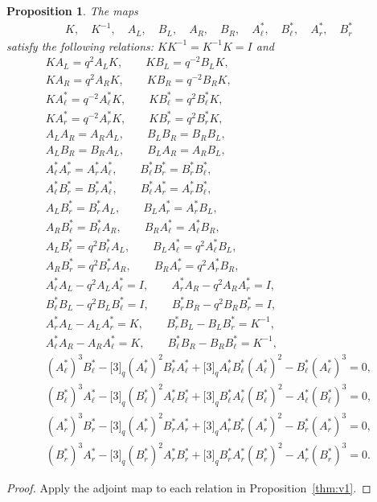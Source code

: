 \documentclass[pdftex]{sigma}
\numberwithin{equation}{section}
\newtheorem{Proposition}[Theorem]{Proposition}
 { \theoremstyle{definition}
\newtheorem{Definition}[Theorem]{Definition}
\newtheorem{Example}[Theorem]{Example}
\newtheorem{Note}[Theorem]{Note}
}
\begin{document}
\begin{Proposition}\label{thm:v2}The maps
\begin{gather}\label{eq:maplist2}
K, \quad K^{-1},
\quad
A_L,
\quad
B_L,
\quad
A_R,
\quad
B_R,
\quad
A^*_\ell,
\quad
B^*_\ell,
\quad
A^*_r,
\quad
B^*_r
\end{gather}
satisfy the following relations: $K K^{-1} = K^{-1}K = I$ and
\begin{gather*}
K A_L = q^{2} A_L K,\qquad K B_L = q^{-2} B_L K,\\
K A_R = q^{2} A_R K,\qquad K B_R = q^{-2} B_R K,\\
K A^*_\ell = q^{-2} A^*_\ell K,\qquad K B^*_\ell = q^{2} B^*_\ell K,\\
K A^*_r = q^{-2} A^*_r K,\qquad K B^*_r = q^{2} B^*_r K,\\
A_L A_R = A_R A_L, \qquad B_L B_R = B_R B_L,\\
A_L B_R = B_R A_L, \qquad B_L A_R = A_R B_L,\\
A^*_\ell A^*_r = A^*_r A^*_\ell, \qquad B^*_\ell B^*_r = B^*_r B^*_\ell,\\
A^*_\ell B^*_r = B^*_r A^*_\ell, \qquad B^*_\ell A^*_r = A^*_r B^*_\ell,\\
A_L B^*_r = B^*_r A_L, \qquad B_L A^*_r = A^*_r B_L,\\
 A_R B^*_\ell = B^*_\ell A_R, \qquad B_R A^*_\ell = A^*_\ell B_R,\\
A_L B^*_\ell = q^{2} B^*_\ell A_L, \qquad B_L A^*_\ell = q^{2} A^*_\ell B_L,\\
A_R B^*_r = q^{2} B^*_r A_R, \qquad B_R A^*_r = q^{2} A^*_r B_R,\\
 A^*_\ell A_L - q^{2} A_L A^*_\ell = I,\qquad A^*_r A_R - q^2 A_R A^*_r = I,\\
 B^*_\ell B_L - q^2 B_L B^*_\ell = I,\qquad B^*_r B_R - q^2 B_R B^*_r = I,\\
A^*_r A_L - A_L A^*_r = K,\qquad B^*_r B_L - B_L B^*_r = K^{-1},\\
A^*_\ell A_R - A_R A^*_\ell = K,\qquad B^*_\ell B_R - B_R B^*_\ell = K^{-1},\\
(A^*_\ell)^3 B^*_\ell-\lbrack 3 \rbrack_q (A^*_\ell)^2 B^*_\ell A^*_\ell+
\lbrack 3 \rbrack_q A^*_\ell B^*_\ell (A^*_\ell)^2-B^*_\ell (A^*_\ell)^3 = 0,\\
(B^*_\ell)^3 A^*_\ell-\lbrack 3 \rbrack_q (B^*_\ell)^2 A^*_\ell B^*_\ell+
\lbrack 3 \rbrack_q B^*_\ell A^*_\ell (B^*_\ell)^2-A^*_\ell (B^*_\ell)^3 = 0,\\
(A^*_r)^3 B^*_r-\lbrack 3 \rbrack_q (A^*_r)^2 B^*_r A^*_r+\lbrack 3 \rbrack_q A^*_r B^*_r (A^*_r)^2-
B^*_r (A^*_r)^3 = 0,\\
(B^*_r)^3 A^*_r-\lbrack 3 \rbrack_q (B^*_r)^2 A^*_r B^*_r+
\lbrack 3 \rbrack_q B^*_r A^*_r (B^*_r)^2-A^*_r (B^*_r)^3 = 0.
\end{gather*}
\end{Proposition}
\begin{proof} Apply the adjoint map to each relation in Proposition~\ref{thm:v1}.
\end{proof}
\end{document}
